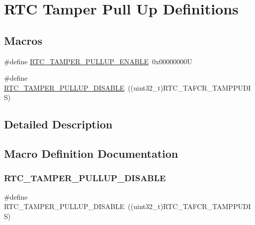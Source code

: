\hypertarget{group___r_t_c_ex___tamper___pull___u_p___definitions}{}\section{R\+TC Tamper Pull Up Definitions}
\label{group___r_t_c_ex___tamper___pull___u_p___definitions}
\subsection*{Macros}
\begin{DoxyCompactItemize}
\item 
\#define \hyperlink{group___r_t_c_ex___tamper___pull___u_p___definitions_gacf26dd43efe81fa45121580187705369}{R\+T\+C\+\_\+\+T\+A\+M\+P\+E\+R\+\_\+\+P\+U\+L\+L\+U\+P\+\_\+\+E\+N\+A\+B\+LE}~0x00000000U
\item 
\#define \hyperlink{group___r_t_c_ex___tamper___pull___u_p___definitions_ga60baa301b46be499bc7f827664df0300}{R\+T\+C\+\_\+\+T\+A\+M\+P\+E\+R\+\_\+\+P\+U\+L\+L\+U\+P\+\_\+\+D\+I\+S\+A\+B\+LE}~((uint32\+\_\+t)R\+T\+C\+\_\+\+T\+A\+F\+C\+R\+\_\+\+T\+A\+M\+P\+P\+U\+D\+IS)
\end{DoxyCompactItemize}


\subsection{Detailed Description}


\subsection{Macro Definition Documentation}
\mbox{\label{group___r_t_c_ex___tamper___pull___u_p___definitions_ga60baa301b46be499bc7f827664df0300}} 
\subsubsection{\texorpdfstring{R\+T\+C\+\_\+\+T\+A\+M\+P\+E\+R\+\_\+\+P\+U\+L\+L\+U\+P\+\_\+\+D\+I\+S\+A\+B\+LE}{RTC\_TAMPER\_PULLUP\_DISABLE}}
{\footnotesize\ttfamily \#define R\+T\+C\+\_\+\+T\+A\+M\+P\+E\+R\+\_\+\+P\+U\+L\+L\+U\+P\+\_\+\+D\+I\+S\+A\+B\+LE~((uint32\+\_\+t)R\+T\+C\+\_\+\+T\+A\+F\+C\+R\+\_\+\+T\+A\+M\+P\+P\+U\+D\+IS)}

